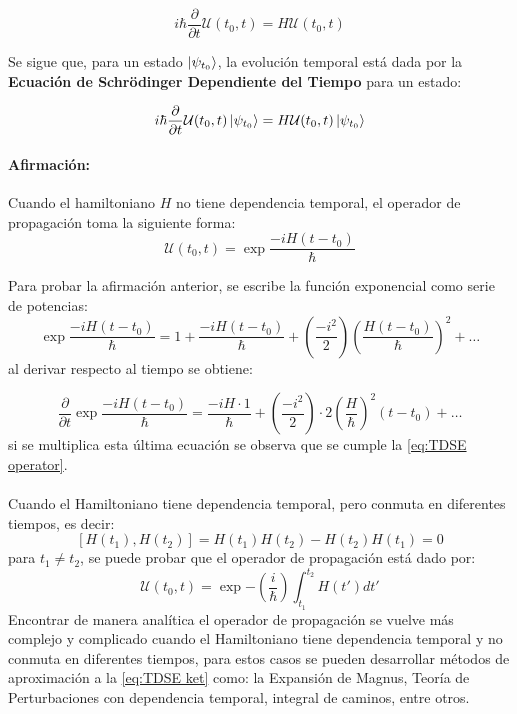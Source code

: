 \begin{equation}
  \label{eq:TDSE operator}
  i\hbar\frac{\partial}{\partial t}\mathcal{U}(t_0,t) = H\mathcal{U}(t_0,t)
\end{equation}

Se sigue que, para un estado $\ket{\psi_{t_0}}$, la evolución temporal está dada por la \textbf{Ecuación de Schrödinger Dependiente del Tiempo} para un estado:

\begin{tcolorbox}[colback=CTtitle!5!white,colframe=CTtitle!85!white]%
\begin{equation}
\label{eq:TDSE ket}
i\hbar\frac{\partial}{\partial t}\mathcal{U}(t_0,t)\ket{\psi_{t_0}} = H\mathcal{U}(t_0,t)\ket{\psi_{t_0}}
\end{equation}
\end{tcolorbox}

\paragraph{Afirmación:}
  Cuando el hamiltoniano $H$ no tiene dependencia temporal, el operador de propagación toma la siguiente forma:
\begin{equation}
\label{eq:U IT}
\mathcal{U}(t_0,t) = \exp{\frac{-iH(t-t_0)}{\hbar}}
\end{equation}

Para probar la afirmación anterior, se escribe la función exponencial como serie de potencias:
$$\exp{\frac{-iH(t-t_0)}{\hbar}} = 1 + \frac{-iH(t-t_0)}{\hbar}+ \left(\frac{-i^2}{2}\right)\left(\frac{H(t-t_0)}{\hbar}\right)^2+\dots $$
al derivar respecto al tiempo se obtiene:

$$\frac{\partial}{\partial t}\exp{\frac{-iH(t-t_0)}{\hbar}} = \frac{-iH\cdot 1}{\hbar}+ \left(\frac{-i^2}{2}\right)\cdot 2\left(\frac{H}{\hbar}\right)^2(t-t_0)+\dots $$
si se multiplica esta última ecuación se observa que se cumple la \autoref{eq:TDSE operator}.
\\\\
Cuando el Hamiltoniano tiene dependencia temporal, pero conmuta en diferentes tiempos, es decir:
$$[H(t_1), H(t_2)] = H(t_1)H(t_2) - H(t_2)H(t_1)=0$$
para $t_1 \neq t_2$, se puede probar que el operador de propagación está dado por:
$$\mathcal{U}(t_0,t) = \exp{-\left( \frac{i}{\hbar}\right)\int_{t_1}^{t_2}H(t')dt'}$$
Encontrar de manera analítica el operador de propagación se vuelve más complejo y complicado cuando el Hamiltoniano tiene dependencia temporal y no conmuta en diferentes tiempos, para estos casos se pueden desarrollar métodos de aproximación a la \autoref{eq:TDSE ket} como: la Expansión de Magnus, Teoría de Perturbaciones con dependencia temporal, integral de caminos, entre otros.


